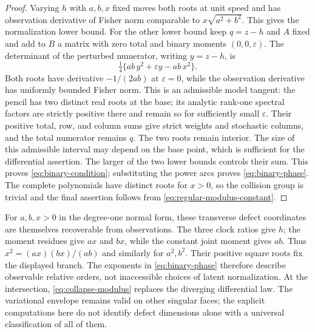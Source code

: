 \begin{proof}
Varying $h$ with $a,b,x$ fixed moves both roots at unit speed and
has observation derivative of Fisher norm comparable to
$x\sqrt{a^2+b^2}$. This gives the normalization lower bound. For the
other lower bound keep $q=z-h$ and $A$ fixed and add to $B$ a matrix
with zero total and binary moments $(0,0,\varepsilon)$. The determinant
of the perturbed numerator, writing $y=z-h$, is
\[
                 \tfrac14\{ab\,y^2+\varepsilon y-ab\,x^2\}.
\]
Both roots have derivative $-1/(2ab)$ at $\varepsilon=0$, while the
observation derivative has uniformly bounded Fisher norm. This is an
admissible model tangent: the pencil has two distinct real roots at
the base; its analytic rank-one spectral factors are strictly positive
there and remain so for sufficiently small $\varepsilon$. Their
positive total, row, and column sums give strict weights and stochastic
columns, and the total numerator remains $q$. The two roots remain
interior. The size of this admissible interval may depend on the base
point, which is sufficient for the differential assertion. The larger
of the two lower bounds controls their sum. This proves
\eqref{eq:binary-condition}; substituting the power arcs proves
\eqref{eq:binary-phase}. The complete polynomials have distinct roots
for $x>0$, so the collision group is trivial and the final assertion
follows from \eqref{eq:regular-modulus-constant}.
\end{proof}

For $a,b,x>0$ in the degree-one normal form, these transverse defect
coordinates are themselves recoverable from observations. The three
clock ratios give $h$; the moment residues give $ax$ and $bx$, while
the constant joint moment gives $ab$. Thus
$x^2=(ax)(bx)/(ab)$ and similarly for $a^2,b^2$. Their positive square
roots fix the displayed branch. The exponents in
\eqref{eq:binary-phase} therefore describe observable relative orders,
not inaccessible choices of latent normalization. At the intersection,
\eqref{eq:collapse-modulus} replaces the diverging differential law.
The variational envelope remains valid on other singular faces; the
explicit computations here do not identify defect dimensions alone
with a universal classification of all of them.
